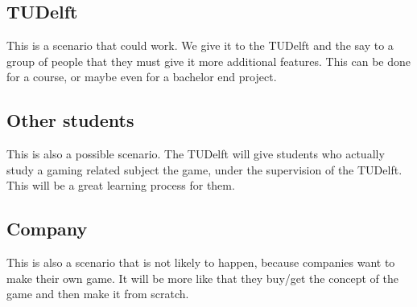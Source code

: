 \documentclass[11pt,twoside,a4paper]{article}
\begin{document}
\subsection{TUDelft}
This is a scenario that could work. We give it to the TUDelft and the say to a group of people that they must give it more additional features. This can be done for a course, or maybe even for a bachelor end project.
\subsection{Other students}
This is also a possible scenario. The TUDelft will give students who actually study a gaming related subject the game, under the supervision of the TUDelft. This will be a great learning process for them.
\subsection{Company}
This is also a scenario that is not likely to happen, because companies want to make their own game. It will be more like that they buy/get the concept of the game and then make it from scratch.
\end{document}

